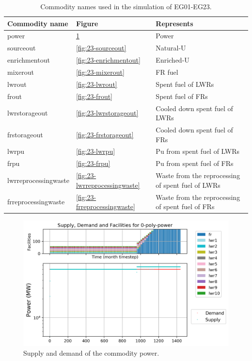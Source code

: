 \documentclass[11pt]{article}
\begin{document}
\begin{table}[H]
	\centering
	\caption{Commodity names used in the simulation of EG01-EG23.}
	\label{tab:23-commodities}
	\begin{tabularx}{\textwidth}{lLL}
		\hline
		Commodity name  & Figure & Represents \\ \hline
  		power           & \ref{fig:23-power} & Power \\
		sourceout       & \ref{fig:23-sourceout} & Natural-U \\
        enrichmentout   & \ref{fig:23-enrichmentout} & Enriched-U \\
        mixerout        & \ref{fig:23-mixerout} & FR fuel \\
  		lwrout          & \ref{fig:23-lwrout} & Spent fuel of LWRs \\
  		frout           & \ref{fig:23-frout} & Spent fuel of FRs \\
  		lwrstorageout   & \ref{fig:23-lwrstorageout} & Cooled down spent fuel of LWRs \\
  		frstorageout    & \ref{fig:23-frstorageout} & Cooled down spent fuel of FRs \\	
  		lwrpu   & \ref{fig:23-lwrpu} & Pu from spent fuel of LWRs \\
  		frpu    & \ref{fig:23-frpu} & Pu from spent fuel of FRs \\
  		lwrreprocessingwaste & \ref{fig:23-lwrreprocessingwaste} & Waste from the reprocessing of spent fuel of LWRs \\
 		frreprocessingwaste & \ref{fig:23-frreprocessingwaste} & Waste from the reprocessing of spent fuel of FRs \\ \hline

	\end{tabularx}
\end{table}

\begin{figure}[H]
	\centering
	\includegraphics[width=\textwidth]{23-figures/0-poly-power.png} 
	\hfill
	\caption{Supply and demand of the commodity power.}
	\label{fig:23-power}
\end{figure}
\end{document}
